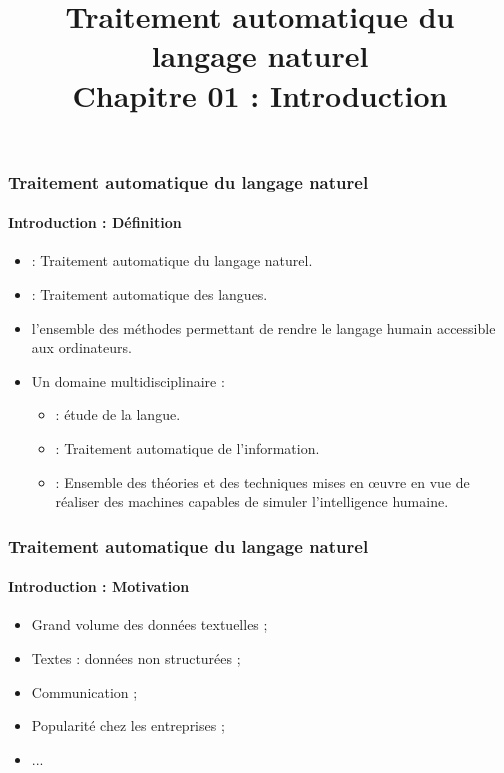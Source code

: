 \documentclass[xcolor=table]{beamer}
\title[TALN : 01- Introduction]%
{Traitement automatique du langage naturel\\Chapitre 01 : Introduction}
\begin{document}
	
\begin{frame}
\frametitle{Traitement automatique du langage naturel}
\framesubtitle{Introduction : Définition}

\begin{itemize}
	\item {} : Traitement automatique du langage naturel.
	\item {} : Traitement automatique des langues.
	\item l'ensemble des méthodes permettant de rendre le langage humain accessible aux ordinateurs.
\end{itemize}
\begin{minipage}{0.78\textwidth}
\begin{itemize}
	\item Un domaine multidisciplinaire :
	\begin{itemize}
		\item {} : étude de la langue.
		\item {} : Traitement automatique de l'information.
		\item {} : Ensemble des théories et des techniques mises en œuvre en vue de réaliser des machines capables de simuler l'intelligence humaine.
	\end{itemize}
\end{itemize}
\end{minipage}
\begin{minipage}{0.20\textwidth}
\end{minipage}
\end{frame}

\begin{frame}
\frametitle{Traitement automatique du langage naturel}
\framesubtitle{Introduction : Motivation}

\begin{itemize}
	\item Grand volume des données textuelles ;
	
	\item Textes : données non structurées ;
	
	\item Communication ;
	
	\item Popularité chez les entreprises ;
	
	\item ...
\end{itemize}

\end{frame}
\end{document}
